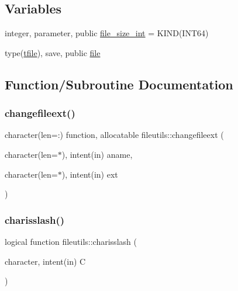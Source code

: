 \subsection*{Variables}
\begin{DoxyCompactItemize}
\item 
integer, parameter, public \mbox{\hyperlink{namespacefileutils_a334ae57c14956bd4597df7a130f6e8a8}{file\+\_\+size\+\_\+int}} = K\+I\+ND(I\+N\+T64)
\item 
type(\mbox{\hyperlink{structfileutils_1_1tfile}{tfile}}), save, public \mbox{\hyperlink{namespacefileutils_a7a95a2141243385ca3ee3909016380ab}{file}}
\end{DoxyCompactItemize}


\subsection{Function/\+Subroutine Documentation}
\mbox{\label{namespacefileutils_a54603adc7cf7864b6f4fe0e3d2b951d3}} 
\subsubsection{\texorpdfstring{changefileext()}{changefileext()}}
{\footnotesize\ttfamily character(len=\+:) function, allocatable fileutils\+::changefileext (\begin{DoxyParamCaption}\item[{character(len=$\ast$), intent(in)}]{aname,  }\item[{character(len=$\ast$), intent(in)}]{ext }\end{DoxyParamCaption})\hspace{0.3cm}{\ttfamily [private]}}

\mbox{\label{namespacefileutils_a325f66a61f2de7872003adf25ec2bfbd}} 
\subsubsection{\texorpdfstring{charisslash()}{charisslash()}}
{\footnotesize\ttfamily logical function fileutils\+::charisslash (\begin{DoxyParamCaption}\item[{character, intent(in)}]{C }\end{DoxyParamCaption})\hspace{0.3cm}{\ttfamily [private]}}




